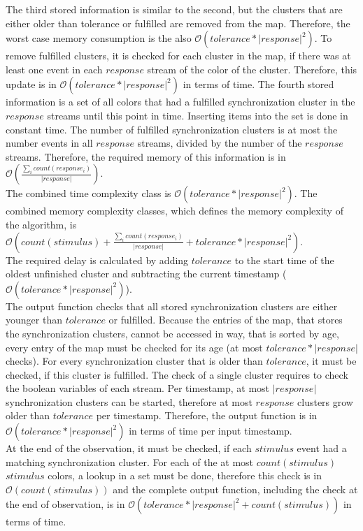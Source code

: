	The third stored information is similar to the second, but the clusters that are either older than tolerance or fulfilled are removed from the map. Therefore, the worst case memory consumption is the also $\mathcal{O}(tolerance*|response|^2)$. To remove fulfilled clusters, it is checked for each cluster in the map, if there was at least one event in each $response$ stream of the color of the cluster. Therefore, this update is in $\mathcal{O}(tolerance*|response|^2)$ in terms of time.
	The fourth stored information is a set of all colors that had a fulfilled synchronization cluster in the $response$ streams until this point in time. Inserting items into the set is done in constant time. The number of fulfilled synchronization clusters is at most the number events in all $response$ streams, divided by the number of the $response$ streams. Therefore, the required memory of this information is in $\mathcal{O}\left(\frac{\sum_i count(response_i)}{|response|}\right)$.\\
	The combined time complexity class is $\mathcal{O}(tolerance*|response|^2)$. The combined memory complexity classes, which defines the memory complexity of the algorithm, is $\mathcal{O}\left(count(stimulus)+\frac{\sum_i count(response_i)}{|response|}+tolerance*|response|^2\right)$.\\
	The required delay is calculated by adding $tolerance$ to the start time of the oldest unfinished cluster and subtracting the current timestamp ($\mathcal{O}(tolerance*|response|^2)$).\\
	The output function checks that all stored synchronization clusters are either younger than $tolerance$ or fulfilled.
	Because the entries of the map, that stores the synchronization clusters, cannot be accessed in way, that is sorted by age, every entry of the map must be checked for its age (at most $tolerance*|response|$ checks). For every synchronization cluster that is older than $tolerance$, it must be checked, if this cluster is fulfilled. The check of a single cluster requires to check the boolean variables of each stream. Per timestamp, at most $|response|$ synchronization clusters can be started, therefore at most $response$ clusters grow older than $tolerance$ per timestamp. Therefore, the output function is in $\mathcal{O}(tolerance*|response|^2)$ in terms of time per input timestamp.\\
	At the end of the observation, it must be checked, if each $stimulus$ event had a matching synchronization cluster. For each of the at most $count(stimulus)$ $stimulus$ colors, a lookup in a set must be done, therefore this check is in $\mathcal{O}(count(stimulus))$ and the complete output function, including the check at the end of observation, is in $\mathcal{O}(tolerance*|response|^2 + count(stimulus))$ in terms of time.



